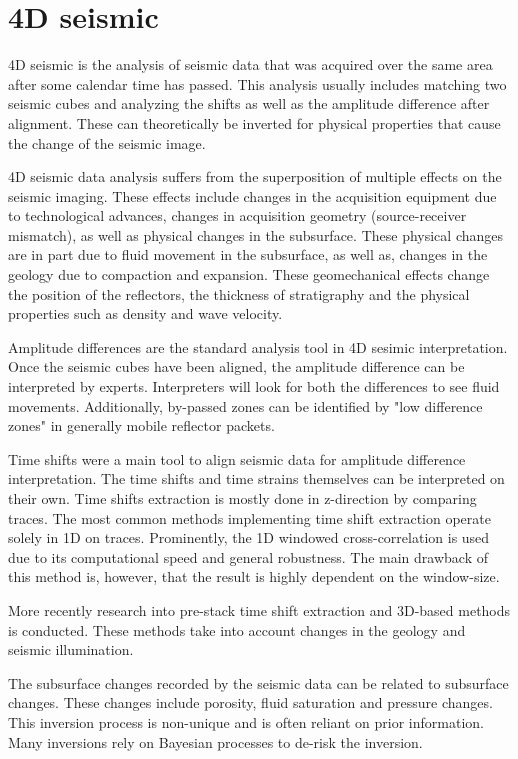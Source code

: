\section{4D seismic}


4D seismic is the analysis of seismic data that was acquired over the same area after some calendar time has passed. This analysis usually includes matching two seismic cubes and analyzing the shifts as well as the amplitude difference after alignment. These can theoretically be inverted for physical properties that cause the change of the seismic image.

4D seismic data analysis suffers from the superposition of multiple effects on the seismic imaging. These effects include changes in the acquisition equipment due to technological advances, changes in acquisition geometry (source-receiver mismatch), as well as physical changes in the subsurface. These physical changes are in part due to fluid movement in the subsurface, as well as, changes in the geology due to compaction and expansion. These geomechanical effects change the position of the reflectors, the thickness of stratigraphy and the physical properties such as density and wave velocity.


Amplitude differences are the standard analysis tool in 4D sesimic interpretation. Once the seismic cubes have been aligned, the amplitude difference can be interpreted by experts. Interpreters will look for both the differences to see fluid movements. Additionally, by-passed zones can be identified by "low difference zones" in generally mobile reflector packets.

Time shifts were a main tool to align seismic data for amplitude difference interpretation. The time shifts and time strains themselves can be interpreted on their own. Time shifts extraction is mostly done in z-direction by comparing traces. The most common methods implementing time shift extraction operate solely in 1D on traces. Prominently, the 1D windowed cross-correlation is used due to its computational speed and general robustness. The main drawback of this method is, however, that the result is highly dependent on the window-size. 

More recently research into pre-stack time shift extraction and 3D-based methods is conducted. These methods take into account changes in the geology and seismic illumination.

The subsurface changes recorded by the seismic data can be related to subsurface changes. These changes include porosity, fluid saturation and pressure changes. This inversion process is non-unique and is often reliant on prior information. Many inversions rely on Bayesian processes to de-risk the inversion. 
